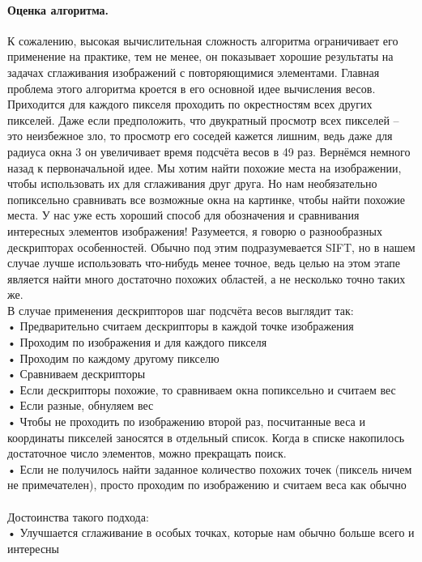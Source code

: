 \documentclass[a4paper,12pt]{article}
\begin{document}
\paragraph{Оценка алгоритма.}
К сожалению, высокая вычислительная сложность алгоритма ограничивает его применение на практике, тем не менее, он показывает хорошие результаты на задачах сглаживания изображений с повторяющимися элементами. Главная проблема этого алгоритма кроется в его основной идее вычисления весов. Приходится для каждого пикселя проходить по окрестностям всех других пикселей. Даже если предположить, что двукратный просмотр всех пикселей – это неизбежное зло, то просмотр его соседей кажется лишним, ведь даже для радиуса окна 3 он увеличивает время подсчёта весов в 49 раз. Вернёмся немного назад к первоначальной идее. Мы хотим найти похожие места на изображении, чтобы использовать их для сглаживания друг друга. Но нам необязательно попиксельно сравнивать все возможные окна на картинке, чтобы найти похожие места. У нас уже есть хороший способ для обозначения и сравнивания интересных элементов изображения! Разумеется, я говорю о разнообразных дескрипторах особенностей. Обычно под этим подразумевается SIFT, но в нашем случае лучше использовать что-нибудь менее точное, ведь целью на этом этапе является найти много достаточно похожих областей, а не несколько точно таких же. \\В случае применения дескрипторов шаг подсчёта весов выглядит так:
\\•	Предварительно считаем дескрипторы в каждой точке изображения
\\•	Проходим по изображения и для каждого пикселя
\\•	Проходим по каждому другому пикселю 
\\•	Сравниваем дескрипторы
\\•	Если дескрипторы похожие, то сравниваем окна попиксельно и считаем вес
\\•	Если разные, обнуляем вес
\\•	Чтобы не проходить по изображению второй раз, посчитанные веса и координаты пикселей заносятся в отдельный список. Когда в списке накопилось достаточное число элементов, можно прекращать поиск.
\\•	Если не получилось найти заданное количество похожих точек (пиксель ничем не примечателен), просто проходим по изображению и считаем веса как обычно
\\
\\
Достоинства такого подхода:
\\•	Улучшается сглаживание в особых точках, которые нам обычно больше всего и интересны
\end{document}
